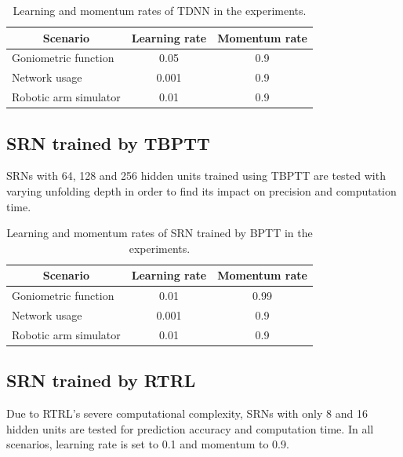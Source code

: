 \documentclass[12pt,oneside]{fithesis2}
\begin{document}
\begin{table}[h]
\centering
\begin{tabular}{|l|c|c|}
\hline
\multicolumn{1}{|c|}{\textbf{Scenario}} & \textbf{Learning rate} & \textbf{Momentum rate} \\ \hline
Goniometric function                    & 0.05                   & 0.9                    \\ \hline
Network usage                           & 0.001                  & 0.9                    \\ \hline
Robotic arm simulator                   & 0.01                   & 0.9                    \\ \hline
\end{tabular}
\caption{Learning and momentum rates of TDNN in the experiments.}
\end{table}


\subsection{SRN trained by TBPTT}
SRNs with 64, 128 and 256 hidden units trained using TBPTT are tested with varying unfolding depth in order to find its impact on precision and computation time.

\begin{table}[h]
\centering
\begin{tabular}{|l|c|c|}
\hline
\multicolumn{1}{|c|}{\textbf{Scenario}} & \textbf{Learning rate} & \textbf{Momentum rate} \\ \hline
Goniometric function                    & 0.01                   & 0.99                    \\ \hline
Network usage                           & 0.001                  & 0.9                    \\ \hline
Robotic arm simulator                   & 0.01                   & 0.9                    \\ \hline
\end{tabular}
\caption{Learning and momentum rates  of SRN trained by BPTT in the experiments.}
\end{table}


\subsection{SRN trained by RTRL}
Due to RTRL's severe computational complexity, SRNs with only 8 and 16 hidden units are tested for prediction accuracy and computation time. In all scenarios, learning rate is set to 0.1 and momentum to 0.9.
\end{document}
